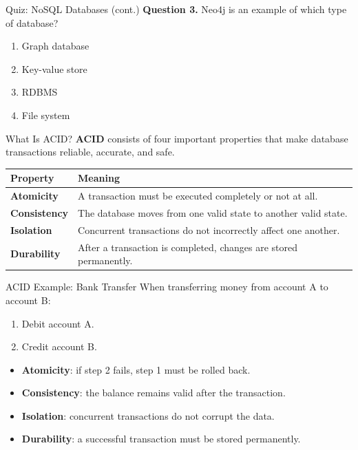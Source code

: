 \documentclass[aspectratio=169,11pt]{beamer}
\newcommand{\keyword}[1]{\textcolor{accent}{\textbf{#1}}}
\newcommand{\tightlist}{\setlength{\itemsep}{2pt}\setlength{\parskip}{0pt}}
\newcommand{\qoption}[2]{\item[#1.] #2}
\begin{document}
\begin{frame}{Quiz: NoSQL Databases (cont.)}
\small
\textbf{Question 3.} Neo4j is an example of which type of database?
\begin{enumerate}
\tightlist
  \qoption{A}{Graph database}
  \qoption{B}{Key-value store}
  \qoption{C}{RDBMS}
  \qoption{D}{File system}
\end{enumerate}
\end{frame}

\begin{frame}{What Is ACID?}
\small
\keyword{ACID} consists of four important properties that make database transactions reliable, accurate, and safe.

\begin{tabularx}{\textwidth}{>{\bfseries}p{} X}
\toprule
Property & Meaning \\
\midrule
Atomicity & A transaction must be executed completely or not at all. \\
Consistency & The database moves from one valid state to another valid state. \\
Isolation & Concurrent transactions do not incorrectly affect one another. \\
Durability & After a transaction is completed, changes are stored permanently. \\
\bottomrule
\end{tabularx}
\end{frame}

\begin{frame}{ACID Example: Bank Transfer}
\small
When transferring money from account A to account B:
\begin{enumerate}
\tightlist
  \item Debit account A.
  \item Credit account B.
\end{enumerate}

\begin{itemize}
\tightlist
  \item \textbf{Atomicity}: if step 2 fails, step 1 must be rolled back.
  \item \textbf{Consistency}: the balance remains valid after the transaction.
  \item \textbf{Isolation}: concurrent transactions do not corrupt the data.
  \item \textbf{Durability}: a successful transaction must be stored permanently.
\end{itemize}
\end{frame}
\end{document}
